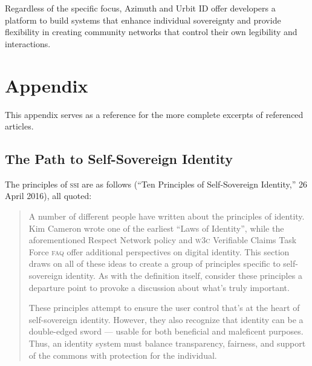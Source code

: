 \documentclass[twoside]{article}
\begin{document}
Regardless of the specific focus, Azimuth and Urbit ID offer developers a platform to build systems that enhance individual sovereignty and provide flexibility in creating community networks that control their own legibility and interactions.\tombstone{}


\section{Appendix}

This appendix serves as a reference for the more complete excerpts of referenced articles.

\subsection{The Path to Self-Sovereign Identity}

The principles of \textsc{ssi} are as follows (``Ten Principles of Self-Sovereign Identity,'' 26 April 2016), all quoted:

\begin{quote}
  A number of different people have written about the principles of identity. Kim Cameron wrote one of the earliest ``Laws of Identity'', while the aforementioned Respect Network policy and \textsc{w3c} Verifiable Claims Task Force \textsc{faq} offer additional perspectives on digital identity. This section draws on all of these ideas to create a group of principles specific to self-sovereign identity. As with the definition itself, consider these principles a departure point to provoke a discussion about what’s truly important.

  These principles attempt to ensure the user control that’s at the heart of self-sovereign identity. However, they also recognize that identity can be a double-edged sword — usable for both beneficial and maleficent purposes. Thus, an identity system must balance transparency, fairness, and support of the commons with protection for the individual.
\end{quote}
\end{document}
